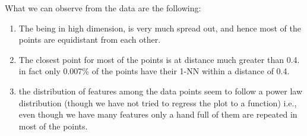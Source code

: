 What we can observe from the data are the following:
\begin{enumerate}

\item {The being in high dimension, is very much spread out, and hence most of the points are equidistant from each other.}\\

\item {The closest point for most of the points is at distance much greater than 0.4. in fact only 0.007\% of the points have their 1-NN within a distance of 0.4.}\\

\item {the distribution of features among the data points seem to follow a power law distribution (though we have not tried to regress the plot to a function) i.e., even though we have many features only a hand full of them are repeated in most of the points.}\\

\end{enumerate}

